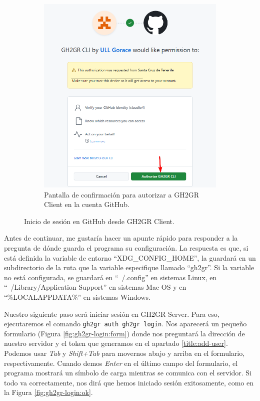 \begin{figure}
\begin{subfigure}{0.32\textwidth}
        \includegraphics[width=\linewidth]{images/gh-authorize-client.png}
        \caption{Pantalla de confirmación para autorizar a GH2GR Client en la cuenta GitHub.}
        \label{fig:gh-client-login:authz}
    \end{subfigure}
    \caption{Inicio de sesión en GitHub desde GH2GR Client.}
\end{figure}

Antes de continuar, me gustaría hacer un apunte rápido para responder a la pregunta de dónde guarda el programa su configuración. La respuesta es que, si está definida la variable de entorno ``XDG\_CONFIG\_HOME'', la guardará en un subdirectorio de la ruta que la variable especifique llamado ``gh2gr''. Si la variable no está configurada, se guardará en ``~/.config'' en sistemas Linux, en ``~/Library/Application Support'' en sistemas Mac OS y en ``\%LOCALAPPDATA\%'' en sistemas Windows.

Nuestro siguiente paso será iniciar sesión en GH2GR Server. Para eso, ejecutaremos el comando \texttt{gh2gr auth gh2gr login}. Nos aparecerá un pequeño formulario (Figura \ref{fig:gh2gr-login:form}) donde nos preguntará la dirección de nuestro servidor y el token que generamos en el apartado \ref{title:add-user}. Podemos usar \textit{Tab} y \textit{Shift+Tab} para movernos abajo y arriba en el formulario, respectivamente. Cuando demos \textit{Enter} en el último campo del formulario, el programa mostrará un símbolo de carga mientras se comunica con el servidor. Si todo va correctamente, nos dirá que hemos iniciado sesión exitosamente, como en la Figura \ref{fig:gh2gr-login:ok}. 

